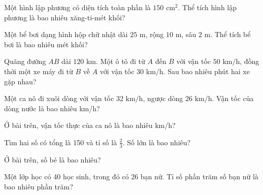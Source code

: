 \begin{ex}
  Một hình lập phương có diện tích toàn phần là $150\text{ cm}^2$. Thể tích hình lập phương là bao nhiêu xăng-ti-mét khối?
\end{ex}

\begin{ex}
  Một bể bơi dạng hình hộp chữ nhật dài $25\text{ m}$, rộng $10\text{ m}$, sâu $2\text{ m}$. Thể tích bể bơi là bao nhiêu mét khối?
\end{ex}

\begin{ex}
  Quãng đường $AB$ dài $120\text{ km}$. Một ô tô đi từ $A$ đến $B$ với vận tốc $50\text{ km/h}$, đồng thời một xe máy đi từ $B$ về $A$ với vận tốc $30\text{ km/h}$. Sau bao nhiêu phút hai xe gặp nhau?
\end{ex}

\begin{ex}
  Một ca nô đi xuôi dòng với vận tốc $32\text{ km/h}$, ngược dòng $26\text{ km/h}$. Vận tốc của dòng nước là bao nhiêu km/h?
\end{ex}

\begin{ex}
  Ở bài trên, vận tốc thực của ca nô là bao nhiêu km/h?
\end{ex}

\begin{ex}
  Tìm hai số có tổng là 150 và tỉ số là $\frac{2}{3}$. Số lớn là bao nhiêu?
\end{ex}

\begin{ex}
  Ở bài trên, số bé là bao nhiêu?
\end{ex}

\begin{ex}
  Một lớp học có 40 học sinh, trong đó có 26 bạn nữ. Tỉ số phần trăm số bạn nữ là bao nhiêu phần trăm?
\end{ex}

